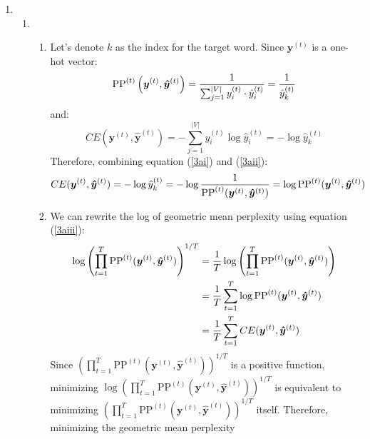 \documentclass[10pt,reqno]{amsart}
\begin{document}
\begin{enumerate}[topsep=0pt,itemsep=3ex,partopsep=1ex,parsep=1ex]
\item
  \begin{enumerate}[itemsep=2ex]
  \item
    \begin{enumerate}[itemsep=2ex]
      \item Let's denote $k$ as the index for the target word. Since $\bm{y}^{(t)}$ is a 
        one-hot vector:
        \begin{equation}
          \text{PP}^{(t)}\left(\bm{y}^{(t)}, \bm{\hat{y}}^{(t)}\right) 
          = \frac{1}{\sum^{|V|}_{j=1} y^{(t)}_i \cdot \hat{y}^{(t)}_i}
          = \frac{1}{\hat{y}^{(t)}_k} \label{3ai}
        \end{equation}
        and:
        \begin{equation}
          CE(\bm{y}^{(t)}, \bm{\hat{y}}^{(t)})
          = - \sum^{|V|}_{j=1} y^{(t)}_i \log \hat{y}^{(t)}_i
          = - \log \hat{y}^{(t)}_k \label{3aii}
        \end{equation}
        Therefore, combining equation (\ref{3ai}) and (\ref{3aii}):
        \begin{equation}
          CE(\bm{y}^{(t)}, \bm{\hat{y}}^{(t)})
          = - \log \hat{y}^{(t)}_k
          = - \log \frac{1}{\text{PP}^{(t)}(\bm{y}^{(t)}, \bm{\hat{y}}^{(t)})}
          = \log \text{PP}^{(t)}(\bm{y}^{(t)}, \bm{\hat{y}}^{(t)}) \label{3aiii}
        \end{equation}
      \item
        We can rewrite the log of geometric mean perplexity using equation (\ref{3aiii}):
        \begin{align*}
          \log \left( \prod^T_{t=1} \text{PP}^{(t)}(\bm{y}^{(t)}, \bm{\hat{y}}^{(t)}) \right)^{1/T}
          &= \frac{1}{T} \log \left( \prod^T_{t=1} \text{PP}^{(t)}(\bm{y}^{(t)}, \bm{\hat{y}}^{(t)}) \right) \\
          &= \frac{1}{T} \sum^T_{t=1} \log \text{PP}^{(t)}(\bm{y}^{(t)}, \bm{\hat{y}}^{(t)}) \\
          &= \frac{1}{T} \sum^T_{t=1} CE(\bm{y}^{(t)}, \bm{\hat{y}}^{(t)})
        \end{align*}
        Since $\left( \prod^T_{t=1} \text{PP}^{(t)}(\bm{y}^{(t)}, \bm{\hat{y}}^{(t)}) \right)^{1/T}$ is 
        a positive function, minimizing 
        $\log \left( \prod^T_{t=1} \text{PP}^{(t)}(\bm{y}^{(t)}, \bm{\hat{y}}^{(t)}) \right)^{1/T}$
        is equivalent to minimizing 
        $\left( \prod^T_{t=1} \text{PP}^{(t)}(\bm{y}^{(t)}, \bm{\hat{y}}^{(t)}) \right)^{1/T}$ itself. 
        Therefore, minimizing the geometric mean perplexity 

\end{enumerate}
\end{enumerate}
\end{enumerate}
\end{document}
